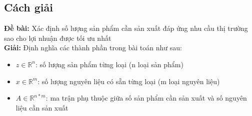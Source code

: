 \documentclass[a4paper]{article}
\begin{document}
    \subsection{Cách giải}
    \textbf{Đề bài:} Xác định số lượng sản phẩm cần sản xuất đáp ứng nhu cầu thị trường sao cho lợi nhuận được tối ưu nhất\\
    \textbf{Giải:} Định nghĩa các thành phần trong bài toán như sau:
        \begin{itemize}
            \item $z \in \mathbb{R}^n$: số lượng sản phẩm từng loại (n loại sản phẩm)
            \item $x \in \mathbb{R}^m$: số lượng nguyên liệu có sẵn từng loại (m loại nguyên liệu)
            \item $A \in \mathbb{R}^{n*m}$: ma trận phụ thuộc giữa số sản phẩm cần sản xuất và số nguyên liệu cần sản xuất
                

\end{itemize}
\end{document}
